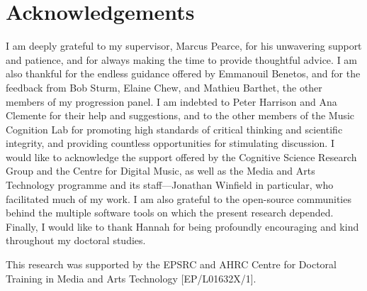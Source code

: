 
\chapter*{Acknowledgements}

I am deeply grateful to my supervisor, Marcus Pearce, for his unwavering support and patience, and for always making the time to provide thoughtful advice. I am also thankful for the endless guidance offered by Emmanouil Benetos, and for the feedback from Bob Sturm, Elaine Chew, and Mathieu Barthet, the other members of my progression panel. I am indebted to Peter Harrison and Ana Clemente for their help and suggestions, and to the other members of the Music Cognition Lab for promoting high standards of critical thinking and scientific integrity, and providing countless opportunities for stimulating discussion. I would like to acknowledge the support offered by the Cognitive Science Research Group and the Centre for Digital Music, as well as the Media and Arts Technology programme and its staff---Jonathan Winfield in particular, who facilitated much of my work. I am also grateful to the open-source communities behind the multiple software tools on which the present research depended. Finally, I would like to thank Hannah for being profoundly encouraging and kind throughout my doctoral studies.

This research was supported by the EPSRC and AHRC Centre for Doctoral Training in Media and Arts Technology [EP/L01632X/1].